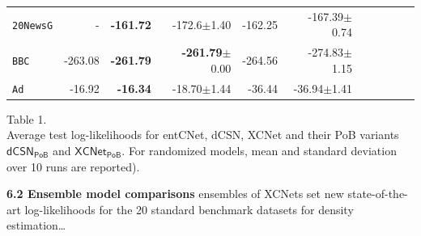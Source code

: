 \documentclass[final]{beamer}
\begin{document}
\begin{frame}{}
\begin{textblock}{17.5}
\begin{minipage}{0.7\linewidth}
\begin{table}[t]
\begin{tabular}{l rrrrrrrrrr}
    \texttt{20NewsG} & - &\textbf{-161.72}&-172.6$\pm$1.40&-162.25&-167.39$\pm$0.74\\
    \texttt{BBC}          &-263.08&\textbf{-261.79}&\textbf{-261.79}$\pm$0.00&-264.56&-274.83$\pm$1.15\\
    \texttt{Ad}           &-16.92&\textbf{-16.34}&-18.70$\pm$1.44&-36.44&-36.94$\pm$1.41\\
    \bottomrule
  \end{tabular}
  \label{tab:ll-sing}
\end{table}
\end{minipage}
\begin{minipage}{0.28\linewidth}
  \scriptsize
  \flushleft
  \vspace{-110pt}
  Table 1.\\
  Average test log-likelihoods for 
  \textsf{entCNet}, \textsf{dCSN}, \textsf{XCNet} and their
  \textsf{PoB} variants $\mathsf{dCSN_{PoB}}$ and $\mathsf{XCNet_{PoB}}$.
    For randomized models, mean and standard deviation over 10 runs are reported).
\end{minipage}

\vspace{10pt}
{\bf 6.2 Ensemble model comparisons}
\small ensembles of XCNets set new state-of-the-art log-likelihoods
for the 20 standard benchmark datasets for density estimation\dots
\vspace{-10pt}
\begin{table}[t]


\end{table}
\end{textblock}
\end{frame}
\end{document}
